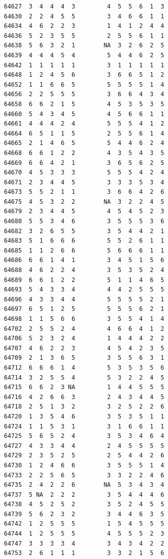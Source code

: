 \documentclass[
  letterpaper,
  DIV=11,
  numbers=noendperiod]{scrreprt}
\begin{document}
\begin{verbatim}
64627  3  4  4  4  3         4  5  5  6  1  3
64630  2  2  4  5  5         3  4  6  6  1  1
64634  4  6  2  2  3         1  4  1  2  4  4
64636  5  2  3  5  5         2  5  5  6  1  1
64638  5  6  3  2  1        NA  3  2  6  2  5
64639  4  4  4  5  4         5  4  4  6  2  5
64642  1  1  1  1  1         3  1  1  1  1  1
64648  1  2  4  5  6         3  6  6  5  1  2
64652  1  1  6  6  5         5  5  5  5  1  4
64656  2  2  5  5  5         3  6  6  4  3  4
64658  6  6  2  1  5         4  5  3  5  3  5
64660  5  4  3  4  5         4  5  6  6  1  1
64661  4  4  4  2  4         5  5  5  4  1  2
64664  6  5  1  1  5         2  5  5  6  1  4
64665  2  1  4  6  5         5  4  4  6  2  4
64668  6  6  1  2  2         4  3  5  4  3  5
64669  6  6  4  2  1         3  6  5  6  2  5
64670  4  5  3  3  3         5  5  5  4  2  4
64671  2  3  4  4  5         3  3  3  5  3  4
64673  5  5  2  1  1         3  6  6  4  2  6
64675  4  5  3  2  2        NA  3  2  2  4  5
64679  2  3  4  4  5         4  5  4  5  2  3
64680  5  5  3  4  6         3  5  5  5  3  6
64682  3  2  6  5  5         3  5  4  4  2  1
64683  5  1  6  6  6         5  5  2  6  1  1
64685  1  1  2  6  6         5  6  6  6  1  1
64686  6  6  1  4  1         3  4  5  1  5  6
64688  4  6  2  2  4         3  5  3  5  2  4
64689  6  6  1  2  2         5  1  1  4  6  5
64693  5  4  3  3  4         4  4  2  5  5  5
64696  4  3  3  4  4         5  5  5  5  2  1
64697  6  5  1  2  5         5  5  5  6  2  1
64698  1  1  5  6  6         3  5  5  4  1  4
64702  2  5  5  2  4         4  6  6  4  1  2
64706  5  2  3  2  4         1  4  4  4  2  2
64707  4  6  2  2  3         4  5  4  2  3  5
64709  2  1  3  6  5         3  5  5  6  3  1
64712  6  6  6  1  4         5  3  5  3  5  6
64714  3  2  5  5  4         5  3  2  2  4  5
64715  6  6  2  3 NA         1  4  4  5  5  5
64716  4  2  6  6  3         2  4  3  4  4  5
64718  2  5  1  3  2         3  2  5  2  2  6
64720  1  3  5  4  6         3  5  3  5  1  1
64724  1  1  5  3  1         3  1  6  6  1  1
64725  5  6  5  2  4         3  5  3  4  6  4
64727  4  3  3  4  4         2  4  5  5  5  5
64729  2  3  5  2  5         2  5  4  4  2  6
64730  1  2  4  6  6         3  5  5  5  1  4
64733  2  2  5  6  5         3  3  2  2  4  6
64735  2  4  2  2  6        NA  5  3  4  3  4
64737  5 NA  2  2  2         3  5  4  4  4  6
64738  4  5  2  5  2         3  5  2  4  5  5
64739  5  6  2  3  2         3  4  4  6  3  5
64742  1  2  5  5  5         1  5  4  5  5  5
64744  1  2  5  5  5         4  5  5  5  2  3
64747  3  3  3  3  4         3  4  3  4  2  2
64753  2  6  1  1  1         3  3  2  1  5  6

\end{verbatim}
\end{document}

